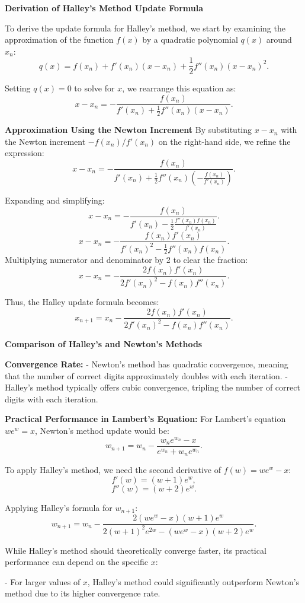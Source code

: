 \documentclass{article}
\begin{document}
\textbf{Derivation of Halley's Method Update Formula}

To derive the update formula for Halley's method, we start by examining the approximation of the function \(f(x)\) by a quadratic polynomial \(q(x)\) around \(x_n\):
\[ q(x) = f(x_n) + f'(x_n)(x - x_n) + \frac{1}{2} f''(x_n)(x - x_n)^2. \]

Setting \(q(x) = 0\) to solve for \(x\), we rearrange this equation as:
\[ x - x_n = -\frac{f(x_n)}{f'(x_n) + \frac{1}{2} f''(x_n)(x - x_n)}. \]

\textbf{Approximation Using the Newton Increment}
By substituting \(x - x_n\) with the Newton increment \(-f(x_n)/f'(x_n)\) on the right-hand side, we refine the expression:
\[ x - x_n = -\frac{f(x_n)}{f'(x_n) + \frac{1}{2} f''(x_n)\left(-\frac{f(x_n)}{f'(x_n)}\right)}. \]

Expanding and simplifying:
\[ x - x_n = -\frac{f(x_n)}{f'(x_n) - \frac{1}{2} \frac{f''(x_n)f(x_n)}{f'(x_n)}}. \]
\[ x - x_n = -\frac{f(x_n)f'(x_n)}{f'(x_n)^2 - \frac{1}{2} f''(x_n)f(x_n)}. \]
Multiplying numerator and denominator by 2 to clear the fraction:
\[ x - x_n = -\frac{2f(x_n)f'(x_n)}{2f'(x_n)^2 - f(x_n)f''(x_n)}. \]

Thus, the Halley update formula becomes:
\[ x_{n+1} = x_n - \frac{2f(x_n)f'(x_n)}{2f'(x_n)^2 - f(x_n)f''(x_n)}. \]

\textbf{Comparison of Halley's and Newton's Methods}

\textbf{Convergence Rate:}
- Newton's method has quadratic convergence, meaning that the number of correct digits approximately doubles with each iteration.
- Halley's method typically offers cubic convergence, tripling the number of correct digits with each iteration.

\textbf{Practical Performance in Lambert's Equation:}
For Lambert's equation \(we^w = x\), Newton's method update would be:
\[ w_{n+1} = w_n - \frac{w_n e^{w_n} - x}{e^{w_n} + w_n e^{w_n}}. \]

To apply Halley's method, we need the second derivative of \(f(w) = we^w - x\):
\[ f'(w) = (w + 1)e^w, \]
\[ f''(w) = (w + 2)e^w. \]

Applying Halley’s formula for \(w_{n+1}\):
\[ w_{n+1} = w_n - \frac{2(we^w - x)(w+1)e^w}{2(w+1)^2 e^{2w} - (we^w - x)(w+2)e^w}. \]

While Halley's method should theoretically converge faster, its practical performance can depend on the specific \(x\):

- For larger values of \(x\), Halley's method could significantly outperform Newton's method due to its higher convergence rate.
\end{document}
